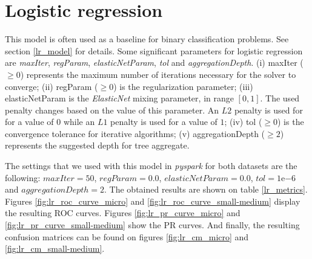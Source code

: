 \documentclass[LaM,binding=0.6cm, english]{sapthesis}
\begin{document}
\section{Logistic regression}

This model is often used as a baseline for binary classification problems. See section \ref{lr_model} for details. Some significant parameters for logistic regression are \textit{maxIter}, \textit{regParam}, \textit{elasticNetParam}, \textit{tol} and \textit{aggregationDepth}. (i) maxIter ($\ge 0$) represents the maximum number of iterations necessary for the solver to converge; (ii) regParam ($\ge 0$) is the regularization parameter; (iii) elasticNetParam is the \textit{ElasticNet} mixing parameter, in range $[0, 1]$. The used penalty changes based on the value of this parameter. An $L2$ penalty is used for for a value of $0$ while an $L1$ penalty is used for a value of $1$; (iv) tol ($\ge 0$) is the convergence tolerance for iterative algorithms; (v) aggregationDepth ($\ge 2$) represents the suggested depth for tree aggregate.\cite{pysparkLR}

The settings that we used with this model in \textit{pyspark}  for both datasets are the following: $maxIter = 50$, $regParam = 0.0$, $elasticNetParam = 0.0$, $tol = 1\mathrm{e}{-6}$ and $aggregationDepth = 2$. The obtained results are shown on table \ref{lr_metrics}. Figures \ref{fig:lr_roc_curve_micro} and \ref{fig:lr_roc_curve_small-medium} display the resulting ROC curves. Figures \ref{fig:lr_pr_curve_micro} and \ref{fig:lr_pr_curve_small-medium} show the PR curves. And finally, the resulting confusion matrices can be found on figures \ref{fig:lr_cm_micro} and \ref{fig:lr_cm_small-medium}.
 
\begin{table}[!ht]
\centering
{}
\vspace{2mm}
\caption{Logistic regression metrics}
\label{lr_metrics}
\end{table}
\end{document}
